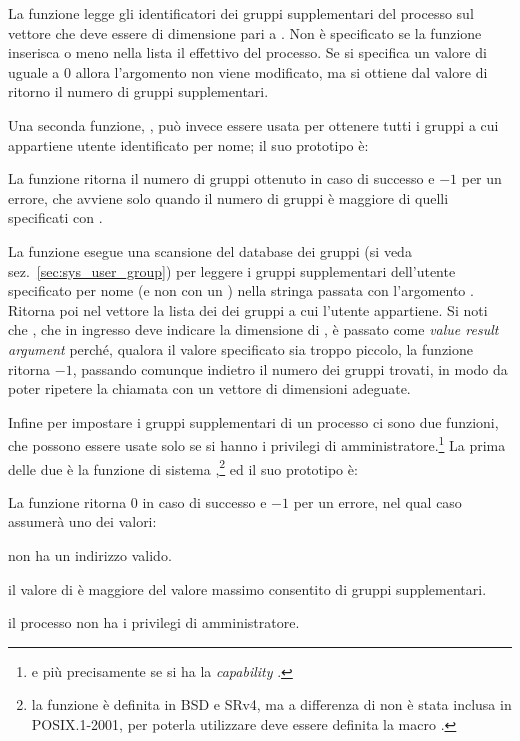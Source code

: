 La funzione legge gli identificatori dei gruppi supplementari del processo sul
vettore  che deve essere di dimensione pari a . Non è
specificato se la funzione inserisca o meno nella lista il  effettivo
del processo. Se si specifica un valore di  uguale a $0$ allora
l'argomento  non viene modificato, ma si ottiene dal valore di
ritorno il numero di gruppi supplementari.

Una seconda funzione, , può invece essere usata per
ottenere tutti i gruppi a cui appartiene utente identificato per nome; il suo
prototipo è:

\begin{funcproto}{ 
}
{La funzione ritorna il numero di gruppi ottenuto in caso di successo e $-1$
  per un errore, che avviene solo quando il numero di gruppi è maggiore di
  quelli specificati con .}
\end{funcproto}

La funzione esegue una scansione del database dei gruppi (si veda
sez.~\ref{sec:sys_user_group}) per leggere i gruppi supplementari dell'utente
specificato per nome (e non con un ) nella stringa passata con
l'argomento . Ritorna poi nel vettore  la lista dei
 dei gruppi a cui l'utente appartiene. Si noti che ,
che in ingresso deve indicare la dimensione di , è passato come
\textit{value result argument} perché, qualora il valore specificato sia
troppo piccolo, la funzione ritorna $-1$, passando comunque indietro il numero
dei gruppi trovati, in modo da poter ripetere la chiamata con un vettore di
dimensioni adeguate.

Infine per impostare i gruppi supplementari di un processo ci sono due
funzioni, che possono essere usate solo se si hanno i privilegi di
amministratore.\footnote{e più precisamente se si ha la \textit{capability}
  .} La prima delle due è la funzione di sistema
,\footnote{la funzione è definita in BSD e SRv4, ma a
  differenza di  non è stata inclusa in POSIX.1-2001, per
  poterla utilizzare deve essere definita la macro .} ed
il suo prototipo è:

\begin{funcproto}{ 
}
{La funzione ritorna $0$ in caso di successo e $-1$ per un errore, nel qual
caso  assumerà uno dei valori:
\begin{errlist}
\item[\errcode{EFAULT}]  non ha un indirizzo valido.
\item[\errcode{EINVAL}] il valore di  è maggiore del valore
    massimo consentito di gruppi supplementari.
\item[\errcode{EPERM}] il processo non ha i privilegi di amministratore.
\end{errlist}}
\end{funcproto}

